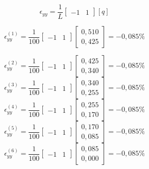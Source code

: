 \documentclass{article} %
\begin{document}
\begin{equation*}
\epsilon_{yy}=\frac{1}{L}\begin{bmatrix}
-1&1
\end{bmatrix}[q]
\end{equation*}


\begin{equation}
\epsilon_{yy}^{(1)}=\frac{1}{100}\begin{bmatrix}
-1&1
\end{bmatrix}\begin{bmatrix}
0,510\\0,425
\end{bmatrix}=-0,085\%
\end{equation}

\begin{equation}
\epsilon_{yy}^{(2)}=\frac{1}{100}\begin{bmatrix}
-1&1
\end{bmatrix}\begin{bmatrix}
0,425\\0,340
\end{bmatrix}=-0,085\%
\end{equation}
\begin{equation}
\epsilon_{yy}^{(3)}=\frac{1}{100}\begin{bmatrix}
-1&1
\end{bmatrix}\begin{bmatrix}
0,340\\0,255
\end{bmatrix}=-0,085\%
\end{equation}
\begin{equation}
\epsilon_{yy}^{(4)}=\frac{1}{100}\begin{bmatrix}
-1&1
\end{bmatrix}\begin{bmatrix}
0,255\\0,170
\end{bmatrix}=-0,085\%
\end{equation}
\begin{equation}
\epsilon_{yy}^{(5)}=\frac{1}{100}\begin{bmatrix}
-1&1
\end{bmatrix}\begin{bmatrix}
0,170\\0,085
\end{bmatrix}=-0,085\%
\end{equation}
\begin{equation}
\epsilon_{yy}^{(6)}=\frac{1}{100}\begin{bmatrix}
-1&1
\end{bmatrix}\begin{bmatrix}
0,085\\0,000
\end{bmatrix}=-0,085\%
\end{equation}
\end{document}
